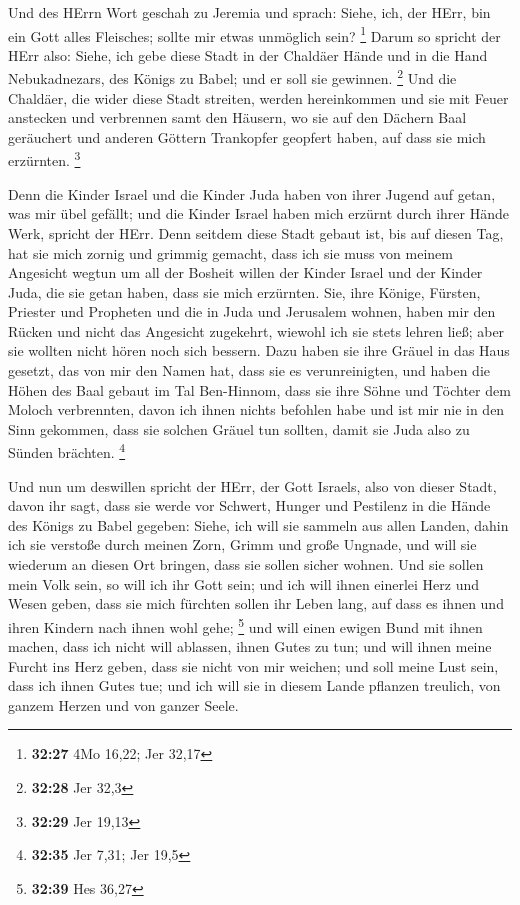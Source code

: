  Und des HErrn Wort geschah zu Jeremia und sprach:
 Siehe, ich, der HErr, bin ein Gott alles Fleisches;
sollte mir etwas unmöglich sein? \footnote{\textbf{32:27} 4Mo 16,22; Jer
  32,17}  Darum so spricht der HErr also: Siehe, ich gebe
diese Stadt in der Chaldäer Hände und in die Hand Nebukadnezars, des
Königs zu Babel; und er soll sie gewinnen. \footnote{\textbf{32:28} Jer
  32,3}  Und die Chaldäer, die wider diese Stadt
streiten, werden hereinkommen und sie mit Feuer anstecken und verbrennen
samt den Häusern, wo sie auf den Dächern Baal geräuchert und anderen
Göttern Trankopfer geopfert haben, auf dass sie mich erzürnten.
\footnote{\textbf{32:29} Jer 19,13}

 Denn die Kinder Israel und die Kinder Juda haben von
ihrer Jugend auf getan, was mir übel gefällt; und die Kinder Israel
haben mich erzürnt durch ihrer Hände Werk, spricht der HErr.
 Denn seitdem diese Stadt gebaut ist, bis auf diesen Tag,
hat sie mich zornig und grimmig gemacht, dass ich sie muss von meinem
Angesicht wegtun  um all der Bosheit willen der Kinder
Israel und der Kinder Juda, die sie getan haben, dass sie mich
erzürnten. Sie, ihre Könige, Fürsten, Priester und Propheten und die in
Juda und Jerusalem wohnen,  haben mir den Rücken und
nicht das Angesicht zugekehrt, wiewohl ich sie stets lehren ließ; aber
sie wollten nicht hören noch sich bessern.  Dazu haben
sie ihre Gräuel in das Haus gesetzt, das von mir den Namen hat, dass sie
es verunreinigten,  und haben die Höhen des Baal gebaut
im Tal Ben-Hinnom, dass sie ihre Söhne und Töchter dem Moloch
verbrennten, davon ich ihnen nichts befohlen habe und ist mir nie in den
Sinn gekommen, dass sie solchen Gräuel tun sollten, damit sie Juda also
zu Sünden brächten. \footnote{\textbf{32:35} Jer 7,31; Jer 19,5}

 Und nun um deswillen spricht der HErr, der Gott Israels,
also von dieser Stadt, davon ihr sagt, dass sie werde vor Schwert,
Hunger und Pestilenz in die Hände des Königs zu Babel gegeben:
 Siehe, ich will sie sammeln aus allen Landen, dahin ich
sie verstoße durch meinen Zorn, Grimm und große Ungnade, und will sie
wiederum an diesen Ort bringen, dass sie sollen sicher wohnen.
 Und sie sollen mein Volk sein, so will ich ihr Gott
sein;  und ich will ihnen einerlei Herz und Wesen geben,
dass sie mich fürchten sollen ihr Leben lang, auf dass es ihnen und
ihren Kindern nach ihnen wohl gehe; \footnote{\textbf{32:39} Hes 36,27}
 und will einen ewigen Bund mit ihnen machen, dass ich
nicht will ablassen, ihnen Gutes zu tun; und will ihnen meine Furcht ins
Herz geben, dass sie nicht von mir weichen;  und soll
meine Lust sein, dass ich ihnen Gutes tue; und ich will sie in diesem
Lande pflanzen treulich, von ganzem Herzen und von ganzer Seele.

